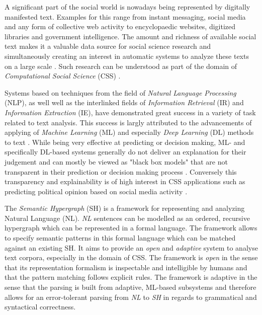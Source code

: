 \documentclass[11pt]{scrreprt}
\let\cite\parencite  %
\begin{document}
A significant part of the social world is nowadays being represented by digitally manifested text. Examples for this range from instant messaging, social media and any form of collective web activity to encyclopaedic websites, digitized libraries and government intelligence. The amount and richness of available social text makes it a valuable data source for social science research and simultaneously creating an interest in automatic systems to analyze these texts on a large scale \cite{evansMachineTranslationMining2016}. Such research can be understood as part of the domain of \textit{Computational Social Science} (CSS) \cite{lazerComputationalSocialScience2009}.

Systems based on techniques from the field of \textit{ Natural Language Processing} (NLP), as well well as the interlinked fields of \textit{Information Retrieval} (IR) and \textit{Information Extraction} (IE), have demonstrated great success in a variety of task related to text analysis. This success is largly attributed to the advancements of applying of \textit{Machine Learning} (ML) and especially \textit{Deep Learning} (DL) methods to text \cite{hirschbergAdvancesNaturalLanguage2015} \cite{qiuPretrainedModelsNatural2020}. While being very effective at predicting or decision making, ML- and specifically DL-based systems generally do not deliver an explanation for their judgement and can mostly be viewed as "black box models" that are not transparent in their prediction or decision making process \cite{rudinStopExplainingBlack2019}. Conversely this transparency and explainability is of high interest in CSS applications such as predicting political opinion based on social media activity \cite{wilkersonLargeScaleComputerizedText2017}.

The \textit{Semantic Hypergraph} (SH) \cite{menezesSemanticHypergraphs2021} is a framework for representing and analyzing Natural Language (NL). \textit{NL} sentences can be modelled as an ordered, recursive hypergraph which can be represented in a formal language. The framework allows to specify semantic patterns in this formal language which can be matched against an existing SH. It aims to provide an \textit{open} and \textit{adaptive} system to analyse text corpora, especially in the domain of CSS. The framework is \textit{open} in the sense that its representation formalism is inspectable and intelligible by humans and that the pattern matching follows explicit rules. The framework is adaptive in the sense that the parsing is built from adaptive, ML-based subsystems and therefore allows for an error-tolerant parsing from \textit{NL} to \textit{SH} in regards to grammatical and syntactical correctness.
\end{document}
